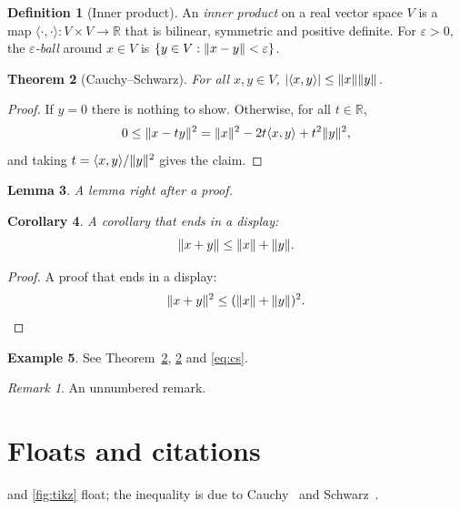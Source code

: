 \documentclass[11pt,letterpaper]{article}
\newtheorem{theorem}{Theorem}[section]
\newtheorem{lemma}[theorem]{Lemma}
\newtheorem{corollary}[theorem]{Corollary}
\theoremstyle{definition}
\newtheorem{definition}[theorem]{Definition}
\newtheorem{example}[theorem]{Example}
\theoremstyle{remark}
\newtheorem*{remark}{Remark}
\DeclarePairedDelimiter{\abs}{\lvert}{\rvert}
\DeclarePairedDelimiter{\norm}{\lVert}{\rVert}
\newcommand{\R}{\mathbb{R}}
\newcommand{\term}[1]{\emph{#1}}
\begin{document}
\begin{definition}[Inner product]
    An \term{inner product} on a real vector space $V$ is a map $\langle \cdot, \cdot \rangle \colon V \times V \to \R$ that is bilinear, symmetric and positive definite.
    For $\varepsilon > 0$, the \term{$\varepsilon$-ball} around $x \in V$ is $\{ y \in V : \norm{x - y} < \varepsilon \}$.
\end{definition}
\begin{theorem}[Cauchy--Schwarz]\label{thm:cs}
    For all $x, y \in V$, $\abs{\langle x, y \rangle} \leq \norm{x}\norm{y}$.
\end{theorem}
\begin{proof}
    If $y = 0$ there is nothing to show. Otherwise, for all $t \in \R$,
    \[ 0 \leq \norm{x - ty}^2 = \norm{x}^2 - 2t\langle x, y \rangle + t^2 \norm{y}^2, \]
    and taking $t = \langle x, y \rangle / \norm{y}^2$ gives the claim. \qedhere
\end{proof}
\begin{lemma}
    A lemma right after a proof.
\end{lemma}
\begin{corollary}
    A corollary that ends in a display:
    \[ \norm{x + y} \leq \norm{x} + \norm{y}. \]
\end{corollary}
\begin{proof}
    A proof that ends in a display:
    \[ \norm{x + y}^2 \leq (\norm{x} + \norm{y})^2. \qedhere \]
\end{proof}
\begin{example}
    See Theorem~\ref{thm:cs}, \cref{thm:cs} and \eqref{eq:cs}.
\end{example}
\begin{remark}
    An unnumbered remark.
\end{remark}


\section{Floats and citations}

 and \cref{fig:tikz} float; the inequality is due to Cauchy~\cite{cauchy} and Schwarz~\cite{schwarz}.
\end{document}
